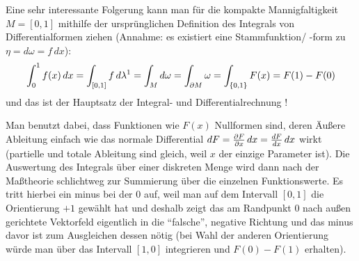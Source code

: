 \documentclass[../H_Analysis_main.tex]{subfiles}
\begin{document}
\begin{bsp}
Eine sehr interessante Folgerung kann man für die kompakte Mannigfaltigkeit $M = [0, 1]$ mithilfe der ursprünglichen Definition des Integrals von Differentialformen ziehen (Annahme: es existiert eine Stammfunktion/ -form zu $\eta = d\omega = f \, dx$):
\begin{align*}
\int_0^1 f(x) \, dx = \int_{\qty[0, 1]} f \, d\lambda^1 = \int_M d\omega = \int_{\partial M} \omega = \int_{\qty{0, 1}} F(x) = F(1) - F(0)
\end{align*}
und das ist der Hauptsatz der Integral- und Differentialrechnung !

Man benutzt dabei, dass Funktionen wie $F(x)$ Nullformen sind, deren Äußere Ableitung einfach wie das normale Differential $dF = \pdv{F}{x} \, dx = \dv{F}{x} \, dx$ wirkt (partielle und totale Ableitung sind gleich, weil $x$ der einzige Parameter ist). Die Auswertung des Integrals über einer diskreten Menge wird dann nach der Maßtheorie schlichtweg zur Summierung über die einzelnen Funktionswerte. Es tritt hierbei ein minus bei der 0 auf, weil man auf dem Intervall $[0, 1]$ die Orientierung $+ 1$ gewählt hat und deshalb zeigt das am Randpunkt 0 nach außen gerichtete Vektorfeld eigentlich in die \enquote{falsche}, negative Richtung und das minus davor ist zum Ausgleichen dessen nötig (bei Wahl der anderen Orientierung würde man über das Intervall $[1, 0]$ integrieren und $F(0) - F(1)$ erhalten).
\end{bsp}
\end{document}

